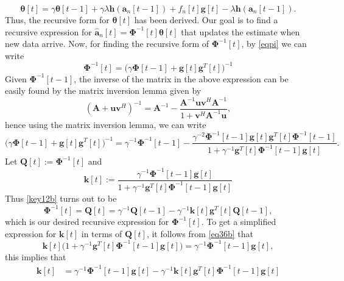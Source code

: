 \documentclass[11pt,final,onecolumn]{IEEEtran}
\begin{document}
\begin{itemize}
\begin{equation}\label{eq42}
\bm \theta [t]=\gamma \bm \theta [t-1] + \gamma \lambda \bm h(\bm a_n[t-1]) + f_n[t] \bm g[t]- \lambda \bm h(\bm a_n[t-1]).
\end{equation}
Thus, the recursive form for $\bm \theta[t]$ has been derived. Our goal is to find a recursive expression for $\hat{\bm a}_n[t]=\bm\Phi ^{-1}[t] \bm \theta [t]$ that updates the estimate when new data arrive. Now, for finding the recursive form of $\bm \Phi ^{-1} [t]$, by \eqref{eqpi} we can write
\begin{equation}\label{eq41}
\bm \Phi^{-1}[t]=\big (\gamma \bm \Phi [t-1]+\bm g[t]\bm g^T[t] \big ) ^{-1} 
\end{equation}
Given $\bm\Phi ^{-1}[t-1]$, the inverse of the matrix in the above expression can be easily found by the matrix inversion lemma given by
\begin{equation}\label{key}
(\bm A+\bm u \bm v^H)^{-1}=\bm A^{-1}-\frac{\bm A^{-1}\bm u \bm v^H\bm A^{-1}} {1+\bm v^H \bm A^{-1}\bm u},
\end{equation}
hence using the matrix inversion lemma, we can write 
\begin{equation}\label{key12b}
\big ( \gamma \bm \Phi [t-1]+\bm g[t]\bm g^T[t] \big )^{-1}= \gamma^{-1}\bm\Phi ^{-1}[t-1]- \frac{\gamma ^{-2}\bm\Phi ^{-1}[t-1]\bm g[t] \bm g^T[t]\bm\Phi ^{-1}[t-1]}{1+\gamma ^{-1}\bm g^T[t]\bm\Phi ^{-1}[t-1]\bm g[t]}.
\end{equation}
Let $\bm Q[t]:=\bm\Phi ^{-1}[t]$ and 
\begin{equation} \label{eq36b}
\bm k[t]:=\frac{\gamma ^{-1} \bm\Phi ^{-1} [t-1]\bm g[t]}{1+ \gamma ^{-1}\bm g^T[t]\bm\Phi ^{-1}[t-1]\bm g[t]}
\end{equation}
Thus \eqref{key12b} turns out to be
\begin{equation}\label{eq39b}
\bm\Phi ^{-1}[t]=\bm Q[t]=\gamma ^{-1} \bm Q[t-1]- \gamma ^{-1} \bm k[t]\bm g^T[t] \bm Q[t-1],
\end{equation} 
which is our desired recursive expression for $\bm\Phi ^{-1}[t]$. To get a simplified expression for $\bm k[t]$ in terms of $\bm Q[t]$, it follows from \eqref{eq36b} that
\begin{equation}\label{key}
\bm k[t]\big(1+ \gamma ^{-1}\bm g^T[t]\bm\Phi ^{-1}[t-1]\bm g[t]\big )=\gamma ^{-1} \bm\Phi ^{-1} [t-1]\bm g[t] ,
\end{equation}
this implies that
\begin{align}\label{key}
\bm k[t]&= \gamma ^{-1} \bm\Phi ^{-1} [t-1]\bm g[t]-\gamma ^{-1}\bm k[t]\bm g^T[t]\bm\Phi ^{-1}[t-1]\bm g[t]\\

\end{align}
\end{itemize}
\end{document}
